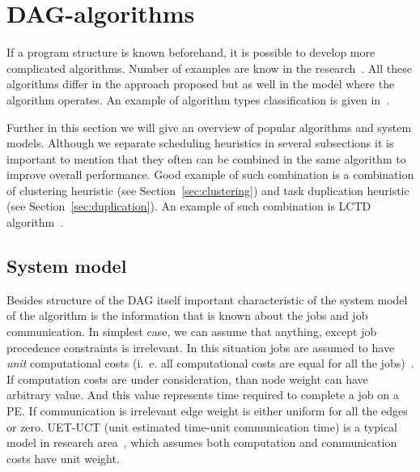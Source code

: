 \section{DAG-algorithms}
\label{sec:dag_algs}

If a program structure is known beforehand, it is possible to develop
more complicated algorithms. Number of examples are know in the
research~\cite{wu1990hypertool,bittencourt2010dag,wu2000mcp,adam1974,kwok1999static,zheng20131673,Topcuoglu2002}. All
these algorithms differ in the approach proposed but as well in the
model where the algorithm operates. An example of algorithm types
classification is given in~\cite{kwok1999static}.

Further in this section we will give an overview of popular algorithms
and system models. Although we separate scheduling heuristics in
several subsections it is important to mention that they often can be
combined in the same algorithm to improve overall performance. Good
example of such combination is a combination of clustering heuristic
(see Section~\ref{sec:clustering}) and task duplication heuristic (see
Section~\ref{sec:duplication}). An example of such combination is LCTD
algorithm~\cite{chen1993performance}. 

\subsection{System model}
\label{sec:model}

Besides structure of the DAG itself important characteristic of the
system model of the algorithm is the information that is known about
the jobs and job communication. In simplest case, we can assume that
anything, except job precedence constraints is irrelevant. In this
situation jobs are assumed to have \emph{unit} computational costs
(i.~e. all computational costs are equal for all the
jobs)~\cite{Hu1961,adam1974}. If computation costs are under
consideration, than node weight can have arbitrary value. And this
value represents time required to complete a job on a PE. If
communication is irrelevant edge weight is either uniform for all the
edges or zero. UET-UCT (unit estimated time-unit communication time)
is a typical model in research area~\cite{finta1996scheduling,
  andronikos2000optimal}, which assumes both computation and
communication costs have unit weight.


